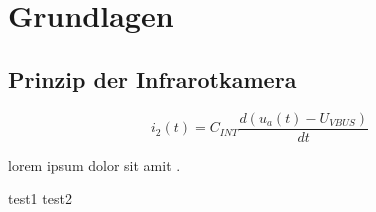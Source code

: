\clearpage
{}
\section{Grundlagen}
\label{Grundlagen}
\vspace{-2mm}
\subsection{Prinzip der Infrarotkamera}

\begin{equation}
i_{2}(t) = C_{INT}\frac{d(u_{a}(t) - U_{V\!BUS})}{dt}
\label{eq:formulai2}
\end{equation}

lorem \cite{puhani2020statistik} ipsum \cite{budziergerlach1} dolor \cite{DAC121Sdatasheet} sit \cite{curvefitting} amit \cite{tissot2}.

test1 test2
